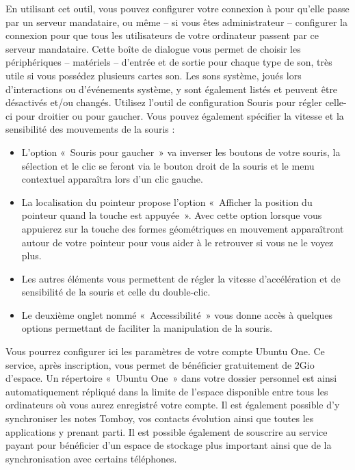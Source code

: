 En utilisant cet outil, vous pouvez configurer votre connexion à  pour qu'elle passe par un serveur mandataire, ou même -- si vous êtes administrateur -- configurer la connexion pour que tous les utilisateurs de votre ordinateur passent par ce serveur mandataire.
Cette boîte de dialogue vous permet de choisir les périphériques -- matériels -- d'entrée et de sortie pour chaque type de son, très utile si vous possédez plusieurs cartes son. Les sons système, joués lors d'interactions ou d'événements système, y sont également listés et peuvent être désactivés et/ou changés.
Utilisez l'outil de configuration Souris pour régler celle-ci pour droitier ou pour gaucher. Vous pouvez également spécifier la vitesse et la sensibilité des mouvements de la souris :
\begin{itemize}
\item L'option «~Souris pour gaucher~» va inverser les boutons de votre souris, la sélection et le clic se feront via le bouton droit de la souris et le menu contextuel apparaîtra lors d'un clic gauche.
\item La localisation du pointeur propose l'option «~Afficher la position du pointeur quand la touche  est appuyée~». Avec cette option lorsque vous appuierez sur la touche  des formes géométriques en mouvement apparaîtront autour de votre pointeur pour vous aider à le retrouver si vous ne le voyez plus.
\item Les autres éléments vous permettent de régler la vitesse d'accélération et de sensibilité de la souris et celle du double-clic.
\item Le deuxième onglet nommé «~Accessibilité~» vous donne accès à quelques options permettant de faciliter la manipulation de la souris.
\end{itemize}
Vous pourrez configurer ici les paramètres de votre compte Ubuntu One. Ce service, après inscription, vous permet de bénéficier gratuitement de 2Gio d'espace. Un répertoire «~Ubuntu One~» dans votre dossier personnel est ainsi automatiquement répliqué dans la limite de l'espace disponible entre tous les ordinateurs où vous aurez enregistré votre compte. Il est également possible d'y synchroniser les notes Tomboy, vos contacts évolution ainsi que toutes les applications y prenant parti. Il est possible également de souscrire au service payant pour bénéficier d'un espace de stockage plus important ainsi que de la synchronisation avec certains téléphones.
